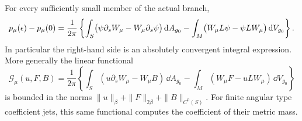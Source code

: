 \begin{lemma}
\label{lem:green}
For every sufficiently small member of the actual branch,
\begin{equation}
 p_\mu(\epsilon)-p_\mu(0)
 =\frac1{2\pi}\left\{
   \int_S\bigl(\psi\partial_sW_\mu-W_\mu\partial_s\psi\bigr)\,\mathrm{d} A_{g_0}
   -\int_M\bigl(W_\mu L\psi-\psi LW_\mu\bigr)\,\mathrm{d} V_{g_0}
                 \right\}.
 \label{ana:green}
\end{equation}
In particular the right-hand side is an absolutely convergent integral
expression.  More generally the linear functional
\begin{equation}
 \mathcal G_\mu(u,F,B)
 =\frac1{2\pi}\left\{
 \int_S(u\partial_sW_\mu-W_\mu B)\,\dd A_{g_0}
 -\int_M(W_\mu F-uLW_\mu)\,\dd V_{g_0}\right\}
 \label{ana:green-functional}
\end{equation}
is bounded in the norms
$\|u\|_\beta+\|F\|_{2\beta}+\|B\|_{C^0(S)}$.
For finite angular type coefficient jets, this same functional computes
the coefficient of their metric mass.
\end{lemma}

